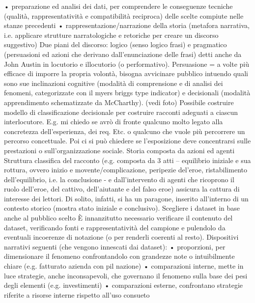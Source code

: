 •	preparazione ed analisi dei dati, per comprendere le conseguenze tecniche (qualità, rappresentatività e compatibilità reciproca) delle scelte compiute nelle stanze precedenti
•	rappresentazione/narrazione della storia (metafora narrativa, i.e. applicare strutture narratologiche e retoriche per creare un discorso suggestivo)
Due piani del discorso: logico (senso logico frasi) e pragmatico (persuasioni ed azioni che derivano dall'enunciazione delle frasi) detti anche da John Austin in locutorio e illocutorio (o performativo).
Persuasione = a volte più efficace di imporre la propria volontà, bisogna avvicinare pubblico intuendo quali sono sue inclinazioni cognitive (modalità di comprensione e di analisi dei fenomeni, categorizzate con il myers briggs type indicator) e decisionali (modalità apprendimento schematizzate da McCharthy).
(vedi foto)
Possibile costruire modello di classificazione decisionale per costruire racconti adeguati a ciascun interlocutore. E.g. mi chiedo se avrò di fronte qualcuno molto legato alla concretezza dell'esperienza, dei req. Etc. o qualcuno che vuole più percorrere un percorso concettuale. Poi ci si può chiedere se l'esposizione deve concentrarsi sulle prestazioni o sull'organizzazione sociale.
Storia composta da azioni ed agenti
Struttura classifica del racconto (e.g. composta da 3 atti – equilibrio iniziale e sua rottura, ovvero inizio e movente/complicazione, peripezie del'eroe, ristabilimento dell'equilibrio, i.e. la conclusione - e dall'intervento di agenti che ricoprono il ruolo dell'eroe, del cattivo, dell'aiutante e del falso eroe) assicura la cattura di interesse dei lettori.
Di solito, infatti, si ha un paragone, inserito all'interno di un contesto storico (mostra stato iniziale e conclusivo).
Scegliere i dataset in base anche al pubblico scelto 
È innanzitutto necessario verificare il contenuto del dataset, verificando fonti e rappresentatività del campione e pulendolo da eventuali incoerenze di notazione (o per renderli coerenti al resto).
Dispositivi narrativi seguenti (che vengono innescati dai dataset):
•	proporzioni, per dimensionare il fenomeno confrontandolo con grandezze note o intuibilmente chiare (e.g. fatturato azienda con pil nazione)
•	comparazioni interne, mette in luce strategie, anche inconsapevoli, che governano il fenomeno sulla base dei pesi degli elementi (e.g. investimenti)
•	comparazioni esterne, confrontano strategie riferite a risorse interne rispetto all'uso consueto
